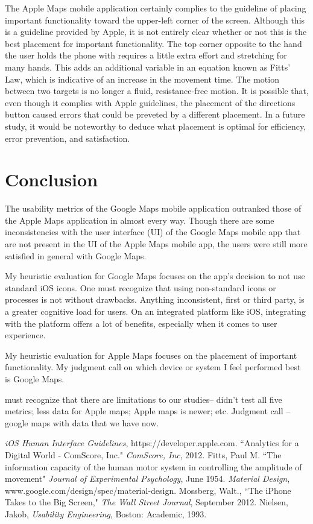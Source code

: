 \documentclass[a4paper; 11pt]{article}
\begin{document}
\par
The Apple Maps mobile application certainly complies to the guideline of placing important functionality toward the upper-left corner of the screen. Although this is a guideline provided by Apple, it is not entirely clear whether or not this is the best placement for important functionality. The top corner opposite to the hand the user holds the phone with requires a little extra effort and stretching for many hands. This adds an additional variable in an equation known as Fitts' Law\cite{Fitts}, which is indicative of an increase in the movement time. The motion between two targets is no longer a fluid, resistance-free motion. It is possible that, even though it complies with Apple guidelines, the placement of the directions button caused errors that could be preveted by a different placement. In a future study, it would be noteworthy to deduce what placement is optimal for efficiency, error prevention, and satisfaction.
\clearpage
\section{Conclusion}
The usability metrics of the Google Maps mobile application outranked those of the Apple Maps application in almost every way. Though there are some inconsistencies with the user interface (UI) of the Google Maps mobile app that are not present in the UI of the Apple Maps mobile app, the users were still more satisfied in general with Google Maps. 
\par
My heuristic evaluation for Google Maps focuses on the app's decision to not use standard iOS icons. One must recognize that using non-standard icons or processes is not without drawbacks. Anything inconsistent, first or third party, is a greater cognitive load for users. On an integrated platform like iOS, integrating with the platform offers a lot of benefits, especially when it comes to user experience.
\par 
My heuristic evaluation for Apple Maps focuses on the placement of important functionality.
My judgment call on which device or system I feel performed best is Google Maps.


must recognize that there are limitations to our studies-- didn't test all five metrics; less data for Apple maps; Apple maps is newer; etc.
Judgment call -- google maps with data that we have now.
\clearpage
\begin{thebibliography}{100} %
 \emph{iOS Human Interface Guidelines}, https://developer.apple.com.
``Analytics for a Digital World - ComScore, Inc." \emph{ComScore, Inc}, 2012.
Fitts, Paul M. ``The information capacity of the human motor system in controlling the amplitude of movement" \emph{Journal of Experimental Psychology}, June 1954.
 \emph{Material Design}, www.google.com/design/spec/material-design.
 Mossberg, Walt., ``The iPhone Takes to the Big Screen," \emph{The Wall Street Journal}, September 2012.
 Nielsen, Jakob, \emph{Usability Engineering}, Boston: Academic, 1993.
\end{thebibliography}
\end{document}
